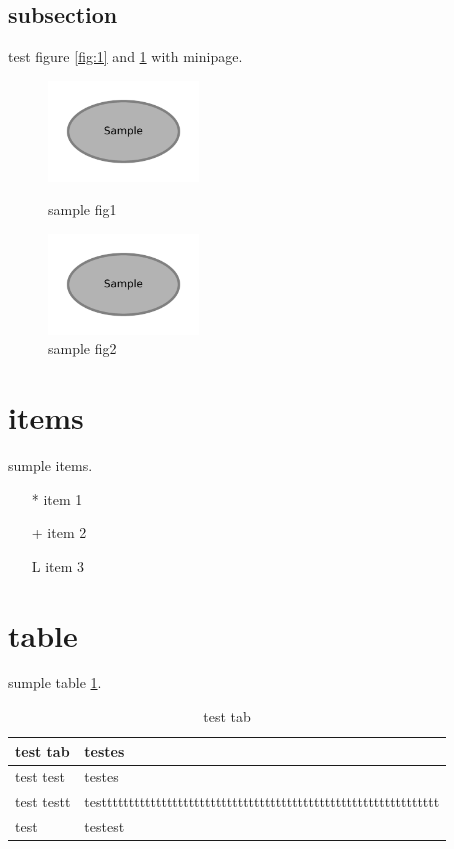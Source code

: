 \documentclass[10pt]{jsarticle}
\begin{document}
\subsection{subsection}
test figure \ref{fig:1} and \ref{fig:2} with minipage.
\begin{figure}[htbp]
 \begin{minipage}{0.5\hsize}
  \begin{center}
  \includegraphics[width=40mm]{sample1.pdf}
  \end{center}
  \caption{sample fig1}
  \label{fig:1}
 \end{minipage}
 \begin{minipage}{0.5\hsize}
  \begin{center}
  \includegraphics[width=40mm]{sample2.pdf}
  \end{center}
  \caption{sample fig2}
  \label{fig:2}
 \end{minipage}
\end{figure}

\newpage

\section{items}
sumple items.
\begin{itemize}
 \item[*] item 1
 \item[+] item 2
 \item[L] item 3
\end{itemize}

\section{table}
sumple table \ref{tab:one}.
\begin{table}[htb]
 \begin{center}
  \caption{test tab}
  \label{tab:one}
  \begin{tabular}[htb]{|p{4cm}|p{10cm}|} \hline
test tab & testes \\ \hline \hline
test test & testes \\ \hline
test testt & testttttttttttttttttttttttttttttttttttttttttttttttttttttttttttttt\\ \hline
test & testest\\ \hline
  \end{tabular}
 \end{center}
\end{table}
\end{document}
